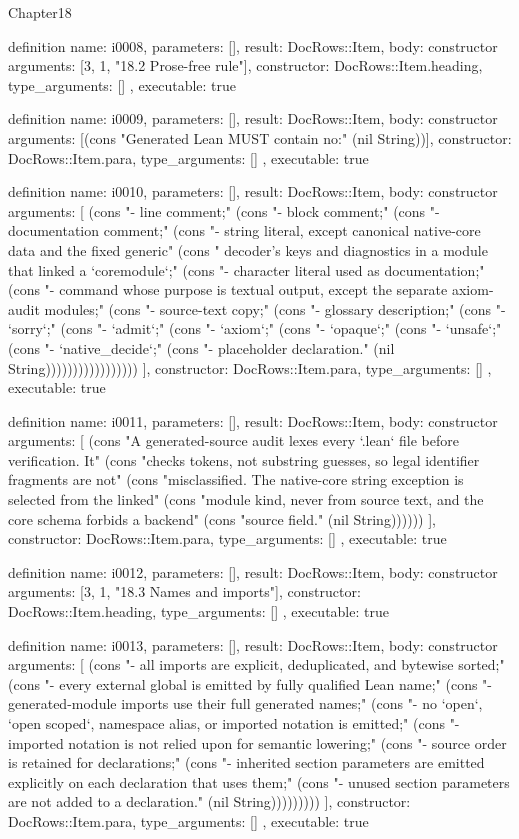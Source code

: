 \begin{lexlean}{Chapter18}
\begin{semanticmodule}
definition{
  name: i0008,
  parameters: [],
  result: DocRows::Item,
  body: constructor{
    arguments: [3, 1, "18.2 Prose-free rule"],
    constructor: DocRows::Item.heading,
    type_arguments: []
  },
  executable: true
}

definition{
  name: i0009,
  parameters: [],
  result: DocRows::Item,
  body: constructor{
    arguments: [(cons "Generated Lean MUST contain no:" (nil String))],
    constructor: DocRows::Item.para,
    type_arguments: []
  },
  executable: true
}

definition{
  name: i0010,
  parameters: [],
  result: DocRows::Item,
  body: constructor{
    arguments: [
      (cons "- line comment;" (cons "- block comment;" (cons "- documentation comment;" (cons "- string literal, except canonical native-core data and the fixed generic" (cons "  decoder's keys and diagnostics in a module that linked a `coremodule`;" (cons "- character literal used as documentation;" (cons "- command whose purpose is textual output, except the separate axiom-audit modules;" (cons "- source-text copy;" (cons "- glossary description;" (cons "- `sorry`;" (cons "- `admit`;" (cons "- `axiom`;" (cons "- `opaque`;" (cons "- `unsafe`;" (cons "- `native_decide`;" (cons "- placeholder declaration." (nil String)))))))))))))))))
    ],
    constructor: DocRows::Item.para,
    type_arguments: []
  },
  executable: true
}

definition{
  name: i0011,
  parameters: [],
  result: DocRows::Item,
  body: constructor{
    arguments: [
      (cons "A generated-source audit lexes every `.lean` file before verification. It" (cons "checks tokens, not substring guesses, so legal identifier fragments are not" (cons "misclassified. The native-core string exception is selected from the linked" (cons "module kind, never from source text, and the core schema forbids a backend" (cons "source field." (nil String))))))
    ],
    constructor: DocRows::Item.para,
    type_arguments: []
  },
  executable: true
}

definition{
  name: i0012,
  parameters: [],
  result: DocRows::Item,
  body: constructor{
    arguments: [3, 1, "18.3 Names and imports"],
    constructor: DocRows::Item.heading,
    type_arguments: []
  },
  executable: true
}

definition{
  name: i0013,
  parameters: [],
  result: DocRows::Item,
  body: constructor{
    arguments: [
      (cons "- all imports are explicit, deduplicated, and bytewise sorted;" (cons "- every external global is emitted by fully qualified Lean name;" (cons "- generated-module imports use their full generated names;" (cons "- no `open`, `open scoped`, namespace alias, or imported notation is emitted;" (cons "- imported notation is not relied upon for semantic lowering;" (cons "- source order is retained for declarations;" (cons "- inherited section parameters are emitted explicitly on each declaration that uses them;" (cons "- unused section parameters are not added to a declaration." (nil String)))))))))
    ],
    constructor: DocRows::Item.para,
    type_arguments: []
  },
  executable: true
}


\end{semanticmodule}
\end{lexlean}
